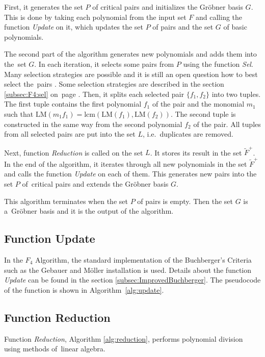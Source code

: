 First, it generates the set $P$ of critical pairs and initializes the Gr\"obner basis $G$. This is done by taking each polynomial from the input set $F$ and calling the function \textit{Update} on it, which updates the set $P$ of pairs and the set $G$ of basic polynomials.

The second part of the algorithm generates new polynomials and adds them into the~set $G$. In each iteration, it selects some pairs from $P$ using the function \textit{Sel}. Many selection strategies are possible and it is still an open question how to best select the~pairs \cite{F4}. Some selection strategies are described in the section \ref{subsec:F4:sel} on~page \pageref{subsec:F4:sel}. Then, it splits each selected pair $\{f_1, f_2\}$ into two tuples. The first tuple contains the first polynomial $f_1$ of the pair and the monomial $m_1$ such that $\textrm{LM}(m_1 f_1) = \textrm{lcm}(\textrm{LM}(f_1),\textrm{LM}(f_2))$. The second tuple is constructed in the same way from the second polynomial $f_2$ of the pair. All tuples from all selected pairs are put into the set $L$, i.e.\ duplicates are removed.

Next, function \textit{Reduction} is called on the set $L$. It stores its result in the set $\tilde{F}^+$. In the end of the algorithm, it iterates through all new polynomials in the set $\tilde{F}^+$ and calls the function \textit{Update} on each of them. This generates new pairs into the set $P$ of~critical pairs and extends the Gr\"obner basis $G$.

This algorithm terminates when the set $P$ of pairs is empty. Then the set $G$ is a~Gr\"obner basis and it is the output of the algorithm.



\subsection{Function Update}
In the $F_4$ Algorithm, the standard implementation of the Buchberger's Criteria such as the Gebauer and M\"oller installation \cite{Gebauer-Moller88} is used. Details about the function \textit{Update} can be found in the section \ref{subsec:ImprovedBuchberger}. The pseudocode of the function is shown in Algorithm~\ref{alg:update}.

\subsection{Function Reduction}
Function \textit{Reduction}, Algorithm \ref{alg:reduction}, performs polynomial division using methods of~linear algebra.


